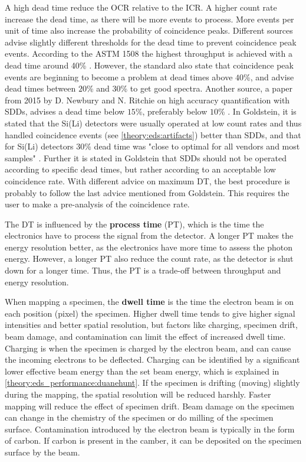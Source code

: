 A high dead time reduce the OCR relative to the ICR.
A higher count rate increase the dead time, as there will be more events to process.
More events per unit of time also increase the probability of coincidence peaks.
Different sources advise slightly different thresholds for the dead time to prevent coincidence peak events.
According to the ASTM 1508 the highest throughput is achieved with a dead time around 40\% \cite{astm_e1508_eds_quantification}.
However, the standard also state that coincidence peak events are beginning to become a problem at dead times above $40$\%, and advise dead times between $20$\% and $30$\% to get good spectra.
Another source, a paper from 2015 by D. Newbury and N. Ritchie on high accuracy quantification with SDDs, advises a dead time below $15$\%, preferably below $10$\% \cite{newbury_deadtime_2014}.
In Goldstein, it is stated that the Si(Li) detectors were usually operated at low count rates and thus handled coincidence events (see \cref{theory:eds:artifacts}) better than SDDs, and that for Si(Li) detectors $30$\% dead time was "close to optimal for all vendors and most samples" \cite[p. 466]{goldstein_scanning_2018}.
Further it is stated in Goldstein that SDDs should not be operated according to specific dead times, but rather according to an acceptable low coincidence rate.
With different advice on maximum DT, the best procedure is probably to follow the last advice mentioned from Goldstein.
This requires the user to make a pre-analysis of the coincidence rate.


The DT is influenced by the \textbf{process time} (PT), which is the time the electronics have to process the signal from the detector.
A longer PT makes the energy resolution better, as the electronics have more time to assess the photon energy.
However, a longer PT also reduce the count rate, as the detector is shut down for a longer time.
Thus, the PT is a trade-off between throughput and energy resolution.


When mapping a specimen, the \textbf{dwell time} is the time the electron beam is on each position (pixel) the specimen.
Higher dwell time tends to give higher signal intensities and better spatial resolution, but factors like charging, specimen drift, beam damage, and contamination can limit the effect of increased dwell time.
Charging is when the specimen is charged by the electron beam, and can cause the incoming electrons to be deflected.
Charging can be identified by a significant lower effective beam energy than the set beam energy, which is explained in \cref{theory:eds_performance:duanehunt}.
If the specimen is drifting (moving) slightly during the mapping, the spatial resolution will be reduced harshly.
Faster mapping will reduce the effect of specimen drift.
Beam damage on the specimen can change in the chemistry of the specimen or do milling of the specimen surface.
Contamination introduced by the electron beam is typically in the form of carbon.
If carbon is present in the camber, it can be deposited on the specimen surface by the beam.




